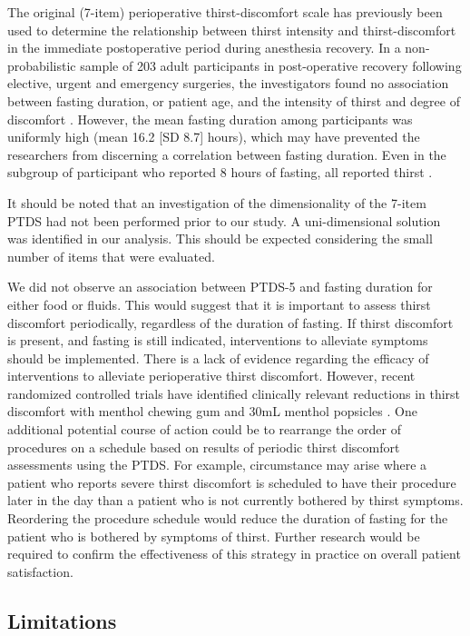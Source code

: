 \documentclass[12pt,twoside,]{pinp}
\begin{document}
The original (7-item) perioperative thirst-discomfort scale has
previously been used to determine the relationship between thirst
intensity and thirst-discomfort in the immediate postoperative period
during anesthesia recovery.\citep{Pierotti_2018} In a non-probabilistic
sample of 203 adult participants in post-operative recovery following
elective, urgent and emergency surgeries, the investigators found no
association between fasting duration, or patient age, and the intensity
of thirst and degree of discomfort \citep{Pierotti_2018}. However, the
mean fasting duration among participants was uniformly high (mean 16.2
{[}SD 8.7{]} hours), which may have prevented the researchers from
discerning a correlation between fasting duration. Even in the subgroup
of participant who reported 8 hours of fasting, all reported thirst
\citep{aroni2012assessment, Pierotti_2018}.

It should be noted that an investigation of the dimensionality of the
7-item PTDS had not been performed prior to our study. A uni-dimensional
solution was identified in our analysis. This should be expected
considering the small number of items that were evaluated.

We did not observe an association between PTDS-5 and fasting duration
for either food or fluids. This would suggest that it is important to
assess thirst discomfort periodically, regardless of the duration of
fasting. If thirst discomfort is present, and fasting is still
indicated, interventions to alleviate symptoms should be implemented.
There is a lack of evidence regarding the efficacy of interventions to
alleviate perioperative thirst discomfort. However, recent randomized
controlled trials have identified clinically relevant reductions in
thirst discomfort with menthol chewing gum and 30mL menthol popsicles
\citep{garcia2019, nascimento2020}. One additional potential course of
action could be to rearrange the order of procedures on a schedule based
on results of periodic thirst discomfort assessments using the PTDS. For
example, circumstance may arise where a patient who reports severe
thirst discomfort is scheduled to have their procedure later in the day
than a patient who is not currently bothered by thirst symptoms.
Reordering the procedure schedule would reduce the duration of fasting
for the patient who is bothered by symptoms of thirst. Further research
would be required to confirm the effectiveness of this strategy in
practice on overall patient satisfaction.

\hypertarget{limitations}{%
\subsection{Limitations}\label{limitations}}
\end{document}
